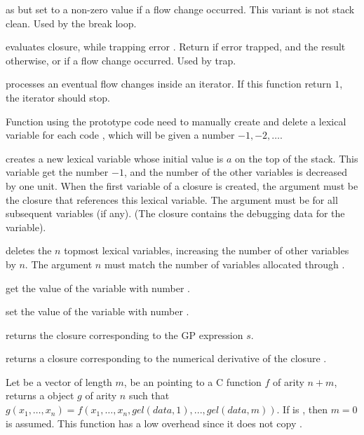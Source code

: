 as 
but set  to a non-zero value if a flow change occurred. This
variant is not stack clean. Used by the break loop.

 evaluates closure, while
trapping error . Return  if error trapped, and the
result otherwise, or  if a flow change occurred. Used by trap.



 processes an eventual flow changes inside an
iterator. If this function return $1$, the iterator should stop.

\label{se:pushlex}

Function using the prototype code  need to manually create and delete a
lexical variable for each code , which will be given a number $-1, -2,
\ldots$.

 creates a new lexical variable whose
initial value is $a$ on the top of the stack. This variable get the number
$-1$, and the number of the other variables is decreased by one unit. When
the first variable of a closure is created, the argument  must be the
closure that references this lexical variable. The argument  must be
 for all subsequent variables (if any).  (The closure contains the
debugging data for the variable).

 deletes the $n$ topmost lexical variables,
increasing the number of other variables by $n$. The argument $n$ must match
the number of variables allocated through .

 get the value of the variable with number .

 set the value of the variable with number
.


 returns the closure corresponding to the
GP expression $s$.

 returns a closure corresponding to the
numerical derivative of the closure .

Let  be a vector of length $m$,  be an 
pointing to a C function $f$ of arity $n+m$, returns a  object
$g$ of arity $n$ such that
$g(x_1,\ldots,x_n)=f(x_1,\ldots,x_n,gel(data,1),...,gel(data,m))$. If
 is , then $m=0$ is assumed.  This function has a low
overhead since it does not copy .

